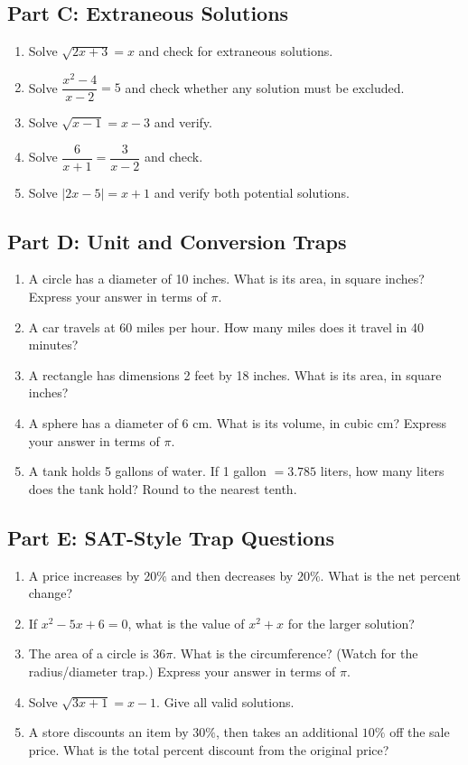 \documentclass[14pt]{extarticle}
\begin{document}
\subsection*{Part C: Extraneous Solutions}
\begin{enumerate}
  \item Solve \(\sqrt{2x + 3} = x\) and check for extraneous solutions.
  \item Solve \(\dfrac{x^2 - 4}{x - 2} = 5\) and check whether any solution must be excluded.
  \item Solve \(\sqrt{x - 1} = x - 3\) and verify.
  \item Solve \(\dfrac{6}{x + 1} = \dfrac{3}{x - 2}\) and check.
  \item Solve \(|2x - 5| = x + 1\) and verify both potential solutions.
\end{enumerate}

\subsection*{Part D: Unit and Conversion Traps}
\begin{enumerate}
  \item A circle has a diameter of 10 inches. What is its area, in square inches? Express your answer in terms of \(\pi\).
  \item A car travels at 60 miles per hour. How many miles does it travel in 40 minutes?
  \item A rectangle has dimensions 2 feet by 18 inches. What is its area, in square inches?
  \item A sphere has a diameter of 6 cm. What is its volume, in cubic cm? Express your answer in terms of \(\pi\).
  \item A tank holds 5 gallons of water. If 1 gallon \(= 3.785\) liters, how many liters does the tank hold? Round to the nearest tenth.
\end{enumerate}

\subsection*{Part E: SAT-Style Trap Questions}
\begin{enumerate}
  \item A price increases by \(20\%\) and then decreases by \(20\%\). What is the net percent change?
  \item If \(x^2 - 5x + 6 = 0\), what is the value of \(x^2 + x\) for the larger solution?
  \item The area of a circle is \(36\pi\). What is the circumference? (Watch for the radius/diameter trap.) Express your answer in terms of \(\pi\).
  \item Solve \(\sqrt{3x + 1} = x - 1\). Give all valid solutions.
  \item A store discounts an item by \(30\%\), then takes an additional \(10\%\) off the sale price. What is the total percent discount from the original price?
\end{enumerate}
\end{document}
